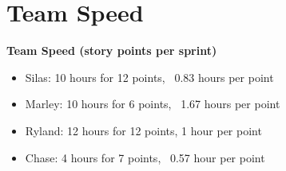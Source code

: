 \section{Team Speed}
\textbf{Team Speed (story points per sprint)}
\begin{itemize}
    \item Silas: 10 hours for 12 points, ~0.83 hours per point
    \item Marley: 10 hours for 6 points, ~1.67 hours per point
    \item Ryland: 12 hours for 12 points, 1 hour per point
    \item Chase: 4 hours for 7 points, ~0.57 hour per point
\end{itemize}